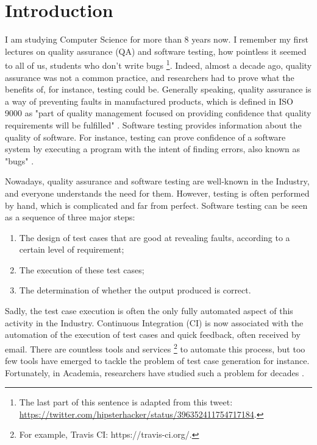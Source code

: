 %
\chapter{Introduction}
\label{sec:intro}

\minitoc

I am studying Computer Science for more than 8 years now. I
remember my first lectures on quality assurance (QA) and software
testing, how pointless it seemed to all of us, students who don't
write bugs \footnote{The last part of this sentence is adapted
from this tweet:
\url{https://twitter.com/hipsterhacker/status/396352411754717184}.}.
Indeed, almost a decade ago, quality assurance was not a common
practice, and researchers had to prove what the benefits of, for
instance, testing could be. Generally speaking, quality assurance
is a way of preventing faults in manufactured products, which is
defined in ISO 9000 as "part of quality management focused on
providing confidence that quality requirements will be fulfilled"
\cite{iso20059000}. Software testing provides information about
the quality of software. For instance, testing can prove
confidence of a software system by executing a program with the
intent of finding errors, also known as "bugs"
\cite{Myers:1979:AST:539883}.

Nowadays, quality assurance and software testing are well-known
in the Industry, and everyone understands the need for them.
However, testing is often performed by hand, which is complicated
and far from perfect. Software testing can be seen as a sequence
of three major steps:

\begin{enumerate}
    \item The design of test cases that are good at revealing
        faults, according to a certain level of requirement;

    \item The execution of these test cases;

    \item The determination of whether the output produced is
        correct.
\end{enumerate}

Sadly, the test case execution is often the only fully automated
aspect of this activity in the Industry. Continuous Integration
(CI) \cite{booch1991object} is now associated with the automation
of the execution of test cases and quick feedback, often received
by email. There are countless tools and services
\footnote{For example, Travis CI: https://travis-ci.org/.} to
automate this process, but too few tools have emerged to tackle
the problem of test case generation for instance. Fortunately, in
Academia, researchers have studied such a problem for decades
\cite{4221614}.


